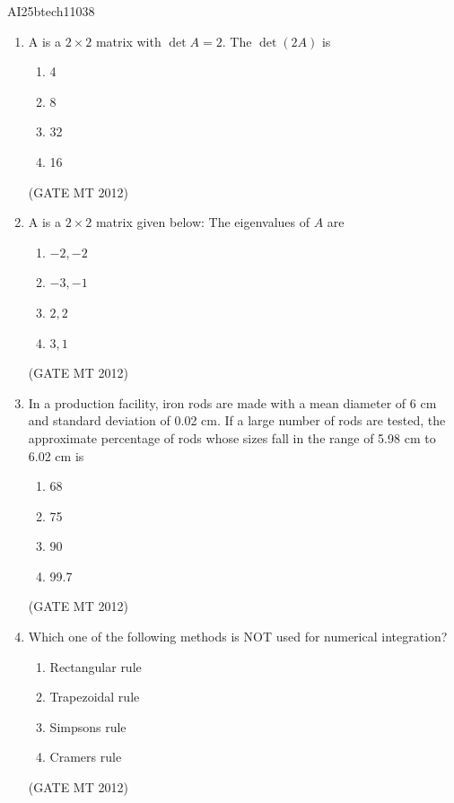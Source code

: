 \documentclass[journal, 11pt, onecolumn]{IEEEtran}
\theoremstyle{remark}
\begin{document}
\begin{center}
    \Large{AI25btech11038}
\end{center} 

\begin{enumerate}

\begin{enumerate}

\item A is a $2 \times 2$ matrix with $\det A = 2$. The $\det (2A)$ is
\begin{multicols}{4}
\begin{enumerate}  
\item 4
\item 8
\item 32
\item 16
\end{enumerate}
\end{multicols}
\hfill(GATE MT 2012)



\item A is a $2 \times 2$ matrix given below:
The eigenvalues of $A$ are 
\begin{multicols}{4}
\begin{enumerate}  
\item $-2, -2$
\item $-3, -1$
\item $2, 2$
\item $3, 1$
\end{enumerate}
\end{multicols}
\hfill(GATE MT 2012)


\item In a production facility, iron rods are made with a mean diameter of 6 cm and standard deviation of 0.02 cm. If a large number of rods are tested, the approximate percentage of rods whose sizes fall in the range of 5.98 cm to 6.02 cm is
\begin{multicols}{4}
\begin{enumerate}  
\item 68
\item 75
\item 90
\item 99.7
\end{enumerate}
\end{multicols}
\hfill(GATE MT 2012)


\item Which one of the following methods is NOT used for numerical integration? 
\begin{multicols}{4}
\begin{enumerate}  
\item Rectangular rule
\item Trapezoidal rule
\item Simpson\textquotesingle s rule
\item Cramer\textquotesingle s rule
\end{enumerate}
\end{multicols}
\hfill(GATE MT 2012)
 


\end{enumerate}
\end{enumerate}
\end{document}
